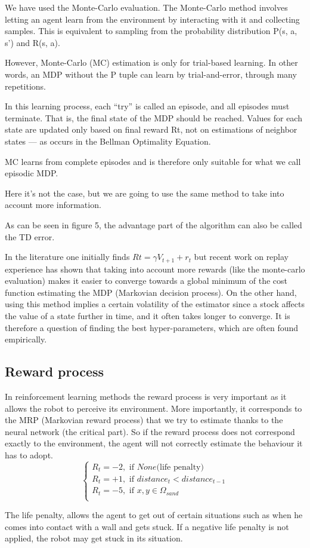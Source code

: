 We have used the Monte-Carlo evaluation.
The Monte-Carlo method involves letting an agent learn from the environment by interacting with it and collecting samples. This is equivalent to sampling from the probability distribution P(s, a, s’) and R(s, a).

However, Monte-Carlo (MC) estimation is only for trial-based learning. In other words, an MDP without the P tuple can learn by trial-and-error, through many repetitions.

In this learning process, each “try” is called an episode, and all episodes must terminate. That is, the final state of the MDP should be reached. Values for each state are updated only based on final reward Rt, not on estimations of neighbor states — as occurs in the Bellman Optimality Equation.

MC learns from complete episodes and is therefore only suitable for what we call episodic MDP.

Here it's not the case, but we are going to use the same method to take into account more information.

As can be seen in figure 5, the advantage part of the algorithm can also be called the TD error.

In the literature one initially finds $Rt =\gamma V_{t+1}+r_{t}$
but recent work on replay experience has shown that taking into account more rewards (like the monte-carlo evaluation) makes it easier to converge towards a global minimum of the cost function estimating the MDP (Markovian decision process).
On the other hand, using this method implies a certain volatility of the estimator since a stock affects the value of a state further in time, and it often takes longer to converge.
It is therefore a question of finding the best hyper-parameters, which are often found empirically.

\subsection{Reward process}
In reinforcement learning methods the reward process is very important as it allows the robot to perceive its environment. 
More importantly, it corresponds to the MRP (Markovian reward process) that we try to estimate thanks to the neural network (the critical part). 
So if the reward process does not correspond exactly to the environment, the agent will not correctly estimate the behaviour it has to adopt.
\begin{equation}
    \label{eqn:constrains}
    \begin{cases}
        R_{t}=-2,   \text{ if } None \text{(life penalty)}\\
        R_{t}=+1,   \text{ if } distance_{t}  <  distance_{t-1}\\
        R_{t}=-5,   \text{ if } x,y \in \Omega_{sand}\\

    \end{cases}
\end{equation}

The life penalty, allows the agent to get out of certain situations such as when he comes into contact with a wall and gets stuck. 
If a negative life penalty is not applied, the robot may get stuck in its situation.

